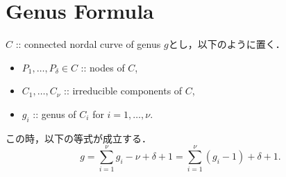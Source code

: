 \documentclass[a4paper]{jsarticle}
\begin{document}
\section{ Genus Formula }
    \begin{Prop}
        $C$ :: connected nordal curve of genus $g$とし，以下のように置く．
        \begin{itemize}
            \item $P_1,\dots,P_{\delta} \in C$ :: nodes of $C$,
            \item $C_1,\dots,C_{\nu}$ :: irreducible components of $C$,
            \item $g_i$ :: genus of $C_i$ for $i=1,\dots,\nu$.
        \end{itemize}
        この時，以下の等式が成立する．
        \[ g=\sum_{i=1}^{\nu} g_i-\nu+\delta+1=\sum_{i=1}^{\nu}(g_i-1)+\delta+1. \]
    \end{Prop}
\end{document}
